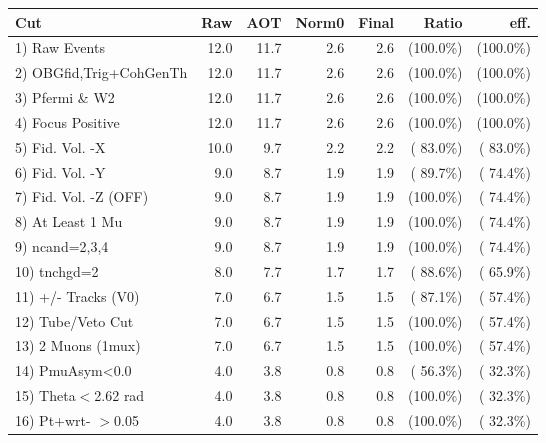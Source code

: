  \begin{table}[h!]\centering
 \begin{tabular}{||l||r|r|r|r|r|r||}
 \hline
 \hline
 Cut & Raw & AOT & Norm0 & Final & Ratio & eff.       \\
 \hline
  1) Raw Events           &         12.0 &         11.7 &          2.6 &          2.6 & (100.0\%) & (100.0\%) \\
  2) OBGfid,Trig+CohGenTh &         12.0 &         11.7 &          2.6 &          2.6 & (100.0\%) & (100.0\%) \\
  3) Pfermi \& W2         &         12.0 &         11.7 &          2.6 &          2.6 & (100.0\%) & (100.0\%) \\
  4) Focus Positive       &         12.0 &         11.7 &          2.6 &          2.6 & (100.0\%) & (100.0\%) \\
  5) Fid. Vol. -X         &         10.0 &          9.7 &          2.2 &          2.2 & ( 83.0\%) & ( 83.0\%) \\
  6) Fid. Vol. -Y         &          9.0 &          8.7 &          1.9 &          1.9 & ( 89.7\%) & ( 74.4\%) \\
  7) Fid. Vol. -Z (OFF)   &          9.0 &          8.7 &          1.9 &          1.9 & (100.0\%) & ( 74.4\%) \\
  8) At Least 1 Mu        &          9.0 &          8.7 &          1.9 &          1.9 & (100.0\%) & ( 74.4\%) \\
  9) ncand=2,3,4          &          9.0 &          8.7 &          1.9 &          1.9 & (100.0\%) & ( 74.4\%) \\
 10) tnchgd=2             &          8.0 &          7.7 &          1.7 &          1.7 & ( 88.6\%) & ( 65.9\%) \\
 11) +/- Tracks (V0)      &          7.0 &          6.7 &          1.5 &          1.5 & ( 87.1\%) & ( 57.4\%) \\
 12) Tube/Veto Cut        &          7.0 &          6.7 &          1.5 &          1.5 & (100.0\%) & ( 57.4\%) \\
 13) 2 Muons (1mux)       &          7.0 &          6.7 &          1.5 &          1.5 & (100.0\%) & ( 57.4\%) \\
 14) PmuAsym<0.0          &          4.0 &          3.8 &          0.8 &          0.8 & ( 56.3\%) & ( 32.3\%) \\
 15) Theta$<$2.62 rad     &          4.0 &          3.8 &          0.8 &          0.8 & (100.0\%) & ( 32.3\%) \\
 16) Pt+wrt- $>$0.05      &          4.0 &          3.8 &          0.8 &          0.8 & (100.0\%) & ( 32.3\%) \\

\end{tabular}
\end{table}
